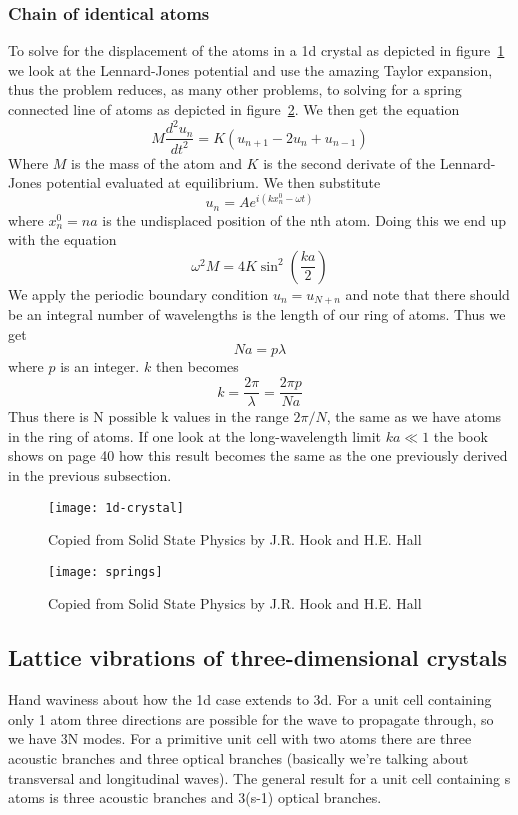 \documentclass[11pt]{article}
\begin{document}
\subsubsection{Chain of identical atoms}
To solve for the displacement of the atoms in a 1d crystal as depicted in figure~\ref{fig:1d-crystal} we look at the Lennard-Jones potential and use the amazing Taylor expansion, thus the problem reduces, as many other problems, to solving for a spring connected line of atoms as depicted in figure~\ref{fig:springs}. We then get the equation 
\begin{equation}
	M \frac{d^2 u_n}{dt^2} = K(u_{n+1} - 2u_n + u_{n-1})
\end{equation}
Where $M$ is the mass of the atom and $K$ is the second derivate of the Lennard-Jones potential evaluated at equilibrium. We then substitute 
\begin{equation}
	u_n = A e^{i(kx^0_n - \omega t)}
\end{equation}
where $x^0_n = na$ is the undisplaced position of the nth atom. Doing this we end up with the equation 
\begin{equation}
	\omega^2 M = 4K \sin^2{(\frac{ka}{2})}
\end{equation}
We apply the periodic boundary condition $u_n =  u_{N+n}$ and note that there should be an integral number of wavelengths is the length of our ring of atoms. Thus we get
\begin{equation}
	Na = p\lambda
\end{equation}
where $p$ is an integer. $k$ then becomes 
\begin{equation}
	k = \frac{2 \pi}{\lambda} = \frac{2\pi p}{Na}
\end{equation}
Thus there is N possible k values in the range $2\pi/N$, the same as we have atoms in the ring of atoms. If one look at the long-wavelength limit $ka \ll 1$ the book shows on page 40 how this result becomes the same as the one previously derived in the previous subsection.
\begin{figure}[!h]
	\centering
	\texttt{[image: 1d-crystal]}
	\caption{Copied from Solid State Physics by J.R. Hook and H.E. Hall}
	\label{fig:1d-crystal}
\end{figure}
\begin{figure}[!h]
	\centering
	\texttt{[image: springs]}
	\caption{Copied from Solid State Physics by J.R. Hook and H.E. Hall}
	\label{fig:springs}
\end{figure}

\subsection{Lattice vibrations of three-dimensional crystals}
Hand waviness about how the 1d case extends to 3d. For a unit cell containing only 1 atom three directions are possible for the wave to propagate through, so we have 3N modes. For a primitive unit cell with two atoms there are three acoustic branches and three optical branches (basically we're talking about transversal and longitudinal waves). The general result for a unit cell containing s atoms is three acoustic branches and 3(s-1) optical branches.
\end{document}
